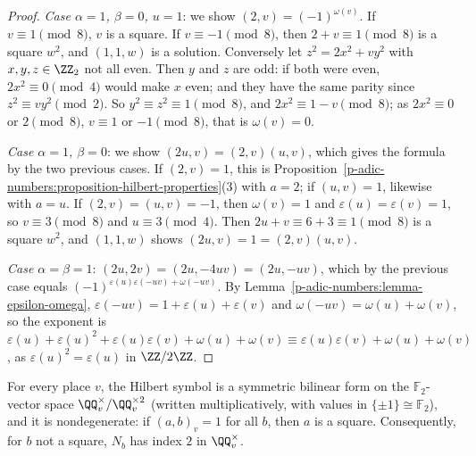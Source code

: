 \begin{proof}
\emph{Case $\alpha = 1$, $\beta = 0$, $u = 1$}: we show $(2, v) = (-1)^{\omega(v)}$. If $v \equiv 1 \pmod 8$, $v$ is a square. If $v \equiv -1 \pmod 8$, then $2 + v \equiv 1 \pmod 8$ is a square $w^2$, and
$(1, 1, w)$ is a solution. Conversely let $z^2 = 2x^2 + vy^2$ with $x, y, z \in \ZZ_2$ not all even. Then $y$ and $z$ are odd: if both were even, $2x^2 \equiv 0 \pmod 4$ would make $x$ even; and they have the
same parity since $z^2 \equiv vy^2 \pmod 2$. So $y^2 \equiv z^2 \equiv 1 \pmod 8$, and $2x^2 \equiv 1 - v \pmod 8$; as $2x^2 \equiv 0$ or $2 \pmod 8$, $v \equiv 1$ or $-1 \pmod 8$, that is $\omega(v) = 0$.

\emph{Case $\alpha = 1$, $\beta = 0$}: we show $(2u, v) = (2, v)(u, v)$, which gives the formula by the two previous cases. If $(2, v) = 1$, this is Proposition~\ref{p-adic-numbers:proposition-hilbert-properties}(3)
with $a = 2$; if $(u, v) = 1$, likewise with $a = u$. If $(2, v) = (u, v) = -1$, then $\omega(v) = 1$ and $\varepsilon(u) = \varepsilon(v) = 1$, so $v \equiv 3 \pmod 8$ and $u \equiv 3 \pmod 4$. Then
$2u + v \equiv 6 + 3 \equiv 1 \pmod 8$ is a square $w^2$, and $(1, 1, w)$ shows $(2u, v) = 1 = (2, v)(u, v)$.

\emph{Case $\alpha = \beta = 1$}: $(2u, 2v) = (2u, -4uv) = (2u, -uv)$, which by the previous case equals $(-1)^{\varepsilon(u)\varepsilon(-uv) + \omega(-uv)}$. By Lemma~\ref{p-adic-numbers:lemma-epsilon-omega},
$\varepsilon(-uv) = 1 + \varepsilon(u) + \varepsilon(v)$ and $\omega(-uv) = \omega(u) + \omega(v)$, so the exponent is $\varepsilon(u) + \varepsilon(u)^2 + \varepsilon(u)\varepsilon(v) + \omega(u) + \omega(v) \equiv
\varepsilon(u)\varepsilon(v) + \omega(u) + \omega(v)$, as $\varepsilon(u)^2 = \varepsilon(u)$ in $\ZZ/2\ZZ$.
\end{proof}

\begin{corollary}\label{p-adic-numbers:corollary-hilbert-bilinear}
For every place $v$, the Hilbert symbol is a symmetric bilinear form on the $\mathbb{F}_2$-vector space $\QQ_v^\times/\QQ_v^{\times2}$ (written multiplicatively, with values in $\{\pm1\} \cong \mathbb{F}_2$), and it is
nondegenerate: if $(a, b)_v = 1$ for all $b$, then $a$ is a square. Consequently, for $b$ not a square, $N_b$ has index $2$ in $\QQ_v^\times$.
\end{corollary}

